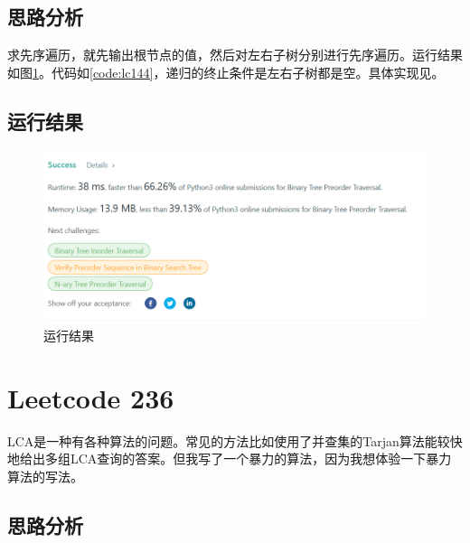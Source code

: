 \documentclass[a4paper,twoside]{article}
\begin{document}
\begin{spacing}{1.2}
\subsection{思路分析}

求先序遍历，就先输出根节点的值，然后对左右子树分别进行先序遍历。运行结果如图\ref{fig:lc144}。代码如\ref{code:lc144}，递归的终止条件是左右子树都是空。具体实现见。

\subsection{运行结果}

\begin{figure}[h]
	\centering
	\label{fig:lc144}
	\caption{运行结果}
	\includegraphics[width=0.8\linewidth]{lc144.png}
\end{figure}

\clearpage

\section{Leetcode 236}

LCA是一种有各种算法的问题。常见的方法比如使用了并查集的Tarjan算法能较快地给出多组LCA查询的答案。但我写了一个暴力的算法，因为我想体验一下暴力算法的写法。

\subsection{思路分析}


\end{spacing}
\end{document}
